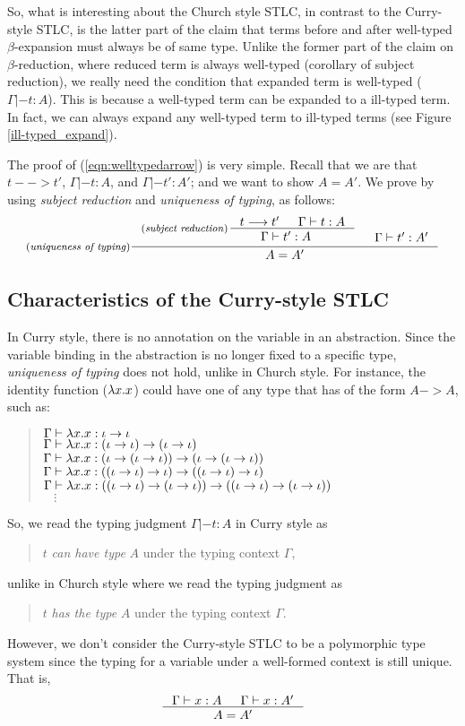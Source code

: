 So, what is interesting about the Church style STLC, in contrast to
the Curry-style STLC, is the latter part of the claim that terms before and
after well-typed $\beta$-expansion must always be of same type. Unlike
the former part of the claim on $\beta$-reduction, where reduced term
is always well-typed (corollary of subject reduction), we really need
the condition that expanded term is well-typed ($\Gamma |- t : A$).
This is because a well-typed term can be expanded to a ill-typed term.
In fact, we can always expand any well-typed term to ill-typed terms
(see Figure \ref{ill-typed_expand}).

The proof of (\ref{eqn:welltypedarrow}) is very simple.
Recall that we are that $t --> t'$, $\Gamma |- t : A$,
and $\Gamma |- t' : A'$; and we want to show $A = A'$.
We prove by using \emph{subject reduction} and \emph{uniqueness of typing},
as follows:
\[ \inference[(\emph{uniqueness of typing})]
	{ \inference[(\emph{subject reduction})\!\!\!]
		{t --> t' & \Gamma |- t : A}
		{\Gamma |- t' : A \phantom{a_f}} 
	& \Gamma |- t' : A' }
	{ A = A' }
\]

\subsection{Characteristics of the Curry-style STLC}\label{sec:stlc:curry}
In Curry style, there is no annotation on the variable in
an abstraction. Since the variable binding in the abstraction is no longer
fixed to a specific type, \emph{uniqueness of typing} does not hold,
unlike in Church style. For instance, the identity function ($\lambda x.x$)
could have one of any type that has of the form $A -> A$, such as:
\begin{quote}\vspace*{-1em}
\begin{singlespace}
$\Gamma |- \lambda x.x : \iota -> \iota$ \\
$\Gamma |- \lambda x.x : (\iota -> \iota) -> (\iota -> \iota)$ \\
$\Gamma |- \lambda x.x : (\iota -> (\iota -> \iota)) -> (\iota -> (\iota -> \iota))$ \\
$\Gamma |- \lambda x.x : ((\iota -> \iota) -> \iota) -> ((\iota -> \iota) -> \iota)$ \\
$\Gamma |- \lambda x.x : ((\iota -> \iota) -> (\iota -> \iota)) -> ((\iota -> \iota) -> (\iota -> \iota))$ \\
$~~~~ \vdots $
\end{singlespace}
\end{quote}
So, we read the typing judgment $\Gamma |- t : A$ in Curry style as
\begin{quote}
$t$ \emph{can have type} $A$ under the typing context $\Gamma$,
\end{quote}
unlike in Church style where we read the typing judgment as
\begin{quote}
$t$ \emph{has the type} $A$ under the typing context $\Gamma$.
\end{quote}
However, we don't consider the Curry-style STLC to be
a polymorphic type system since the typing for a variable
under a well-formed context is still unique. That is,
\[ \inference{\Gamma |- x : A & \Gamma |- x : A'}{A = A'} \]

